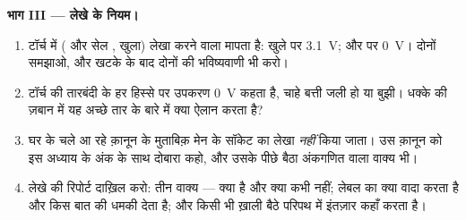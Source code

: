 \begin{problem}
\medskip\noindent\textbf{भाग III --- लेखे के नियम।}
\begin{enumerate}[resume]
  \item टॉर्च में ( और सेल ,  खुला) लेखा करने वाला
        मापता है: खुले  पर \qty{3.1}{V}; और  पर \qty{0}{V}।
        दोनों समझाओ, और खटके के बाद दोनों की भविष्यवाणी भी करो।
  \item टॉर्च की तारबंदी के हर हिस्से पर उपकरण \qty{0}{V} कहता है,
        चाहे बत्ती जली हो या बुझी। धक्के की ज़बान में यह अच्छे तार के
        बारे में क्या ऐलान करता है?
  \item घर के चले आ रहे क़ानून के मुताबिक़ मेन के सॉकेट का लेखा
        \emph{नहीं} किया जाता। उस क़ानून को इस अध्याय के अंक के साथ
        दोबारा कहो, और उसके पीछे बैठा अंकगणित वाला वाक्य भी।
  \item लेखे की रिपोर्ट दाख़िल करो: तीन वाक्य ---  क्या है
        और क्या कभी नहीं; लेबल का  क्या वादा करता है
        और किस बात की धमकी देता है; और किसी भी ख़ाली बैठे परिपथ में
         इंतज़ार कहाँ करता है।
\end{enumerate}
\end{problem}
